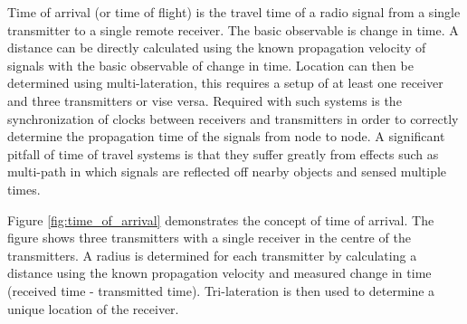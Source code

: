 \documentclass[11pt,a4paper]{report}
\begin{document}
			Time of arrival (or time of flight) is the travel time of a radio signal from a single transmitter to a single remote receiver. The basic observable is change in time. A distance can be directly calculated using the known propagation velocity of signals with the basic observable of change in time. Location can then be determined using multi-lateration, this requires a setup of at least one receiver and three transmitters or vise versa.
			Required with such systems is the synchronization of clocks between receivers and transmitters in order to correctly determine the propagation time of the signals from node to node.
			A significant pitfall of time of travel systems is that they suffer greatly from effects such as multi-path in which signals are reflected off nearby objects and sensed multiple times.
			\cite{k._pahlavan_wideband_1998}
			
			Figure \ref{fig:time_of_arrival} demonstrates the concept of time of arrival. The figure shows three transmitters with a single receiver in the centre of the transmitters. A radius is determined for each transmitter by calculating a distance using the known propagation velocity and measured change in time (received time - transmitted time). Tri-lateration is then used to determine a unique location of the receiver.
		
\end{document}
